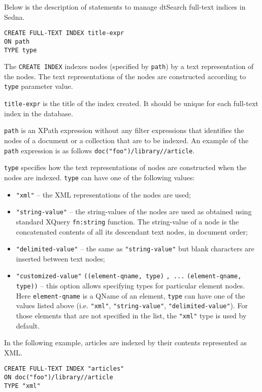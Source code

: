 \documentclass[a4paper,12pt]{article}
\begin{document}
Below is the description of statements to manage dtSearch full-text indices in
Sedna.

\begin{verbatim}
CREATE FULL-TEXT INDEX title-expr
ON path
TYPE type
\end{verbatim}

The \verb!CREATE INDEX! indexes nodes (specified by \verb!path!) by a text
representation of the nodes. The text representations of the nodes are
constructed according to \verb!type! parameter value.

\verb!title-expr! is the title of the index created. It should be unique for
each full-text index in the database.

\verb!path! is an XPath expression without any filter expressions that
identifies the nodes of a document or a collection that are to be indexed. An
example of the \verb!path! expression is as follows
\verb!doc("foo")/library//article!.

\verb!type! specifies how the text representations of nodes are constructed when
the nodes are indexed. \verb!type! can have one of the following values:

\begin{itemize}
\item \verb!"xml"! -- the XML representations of the nodes are used;
\item \verb!"string-value"! -- the string-values of the nodes are used as
obtained using standard XQuery \verb!fn:string! function. The string-value of a
node is the concatenated contents of all its descendant text nodes, in document
order;
\item \verb!"delimited-value"! -- the same as \verb!"string-value"! but blank
characters are inserted between text nodes;
\item \verb!"customized-value"! \verb!((element-qname, type)! \verb!, ...!
\verb!(element-qname, type))! -- this option allows specifying types for
particular element nodes. Here \verb!element-qname! is a QName of an element,
\verb!type! can have one of the values listed above (i.e. \verb!"xml"!,
\verb!"string-value"!, \verb!"delimited-value"!). For those elements that are
not specified in the list, the \verb!"xml"! type is used by default.
\end{itemize}

In the following example, articles are indexed by their contents represented as
XML.

\begin{verbatim}
CREATE FULL-TEXT INDEX "articles"
ON doc("foo")/library//article
TYPE "xml"
\end{verbatim}
\end{document}

